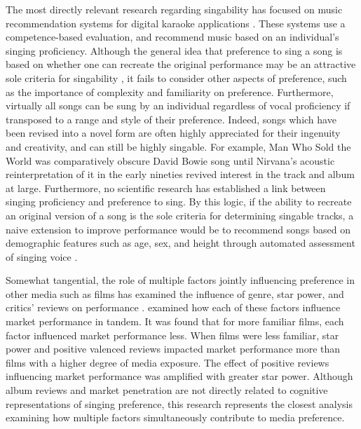 The most directly relevant research regarding singability has focused on music recommendation systems for digital karaoke applications \cite{mao2014song,mao2015competence}. These systems use a competence-based evaluation, and recommend music based on an individual's singing proficiency. Although the general idea that preference to sing a song is based on whether one can recreate the original performance may be an attractive sole criteria for singability \cite{guan2017efficient}, it fails to consider other aspects of preference, such as the importance of complexity and familiarity on preference. Furthermore, virtually all songs can be sung by an individual regardless of vocal proficiency if transposed to a range and style of their preference. Indeed, songs which have been revised into a novel form are often highly appreciated for their ingenuity and creativity, and can still be highly singable. For example, Man Who Sold the World was comparatively obscure David Bowie song until Nirvana's acoustic reinterpretation of it in the early nineties revived interest in the track and album at large. Furthermore, no scientific research has established a link between singing proficiency and preference to sing. By this logic, if the ability to recreate an original version of a song is the sole criteria for determining singable tracks, a naive extension to improve performance would be to recommend songs based on demographic features such as age, sex, and height through automated assessment of singing voice \cite{Weninger2011}.

Somewhat tangential, the role of multiple factors jointly influencing preference in other media such as films has examined the influence of genre, star power, and critics' reviews on performance \cite{desai2005interactive}. \cite{desai2005interactive} examined how each of these factors influence market performance in tandem. It was found that for more familiar films, each factor influenced market performance less. When films were less familiar, star power and positive valenced reviews impacted market performance more than films with a higher degree of media exposure. The effect of positive reviews influencing market performance was amplified with greater star power. Although album reviews and market penetration are not directly related to cognitive representations of singing preference, this research represents the closest analysis examining how multiple factors simultaneously contribute to media preference.


